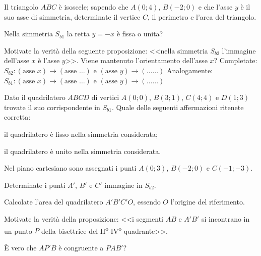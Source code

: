 \begin{esercizio}
  \label{ese:8.30} %
  Il triangolo $ABC$ è isoscele; sapendo che $A(0;4)$, $B(-2;0)$ e che 
  l'asse $y$ è il suo asse di simmetria, determinate il vertice $C$, il 
  perimetro e l'area del triangolo.
\end{esercizio}

\begin{esercizio}
  \label{ese:8.34} %
  Nella simmetria $S_{b1}$ la retta $y=-x$ è fissa o unita?
\end{esercizio}

\begin{esercizio}
  \label{ese:8.35} %
  Motivate la verità della seguente proposizione: <<nella simmetria 
  $S_{b2}$ l'immagine dell'asse $x$ è l'asse $y$>>. Viene mantenuto 
  l'orientamento dell'asse $x$?
  Completate: $S_{b2}:(\text{asse }x)\rightarrow (\text{asse } 
  \ldots{})$ e $(\text{asse }y)\rightarrow(\ldots\ldots{})$
  Analogamente: $S_{b1}:(\text{asse }x)\rightarrow (\text{asse } 
  \ldots{})$ e $(\text{asse }y)\rightarrow(\ldots\ldots{})$
\end{esercizio}

\begin{esercizio}
  \label{ese:8.36} %
  Dato il quadrilatero $ABCD$ di vertici $A(0;0)$, $B(3;1)$, $C(4;4)$ e 
  $D(1;3)$ trovate il suo corrispondente in $S_{b1}$. Quale delle 
  seguenti affermazioni ritenete corretta:
  \begin{enumeratea}
    \item il quadrilatero è fisso nella simmetria considerata;
    \item il quadrilatero è unito nella simmetria considerata.
  \end{enumeratea}
\end{esercizio}

\begin{esercizio}
  \label{ese:8.38} %
  Nel piano cartesiano sono assegnati i punti $A(0;3)$, $B(-2;0)$ e 
  $C(-1;-3)$.
  \begin{enumeratea}
    \item Determinate i punti $A'$, $B'$ e $C'$ immagine in $S_{b2}$.
    \item Calcolate l'area del quadrilatero $A'B'C'O$, essendo $O$ 
    l'origine del riferimento.
    \item Motivate la verità della proposizione: <<i segmenti $AB$ e 
    $A'B'$ si incontrano in un punto $P$ della bisettrice del 
    II\textsuperscript{o}-IV\textsuperscript{o} quadrante>>.
    \item \`E vero che $AP'B$ è congruente a $PAB'$?
  \end{enumeratea}
\end{esercizio}

